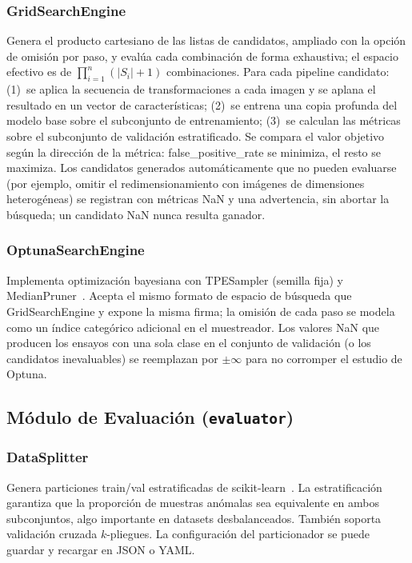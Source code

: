 \documentclass[conference,spanish]{IEEEtran}
\begin{document}
\subsubsection{GridSearchEngine}

Genera el producto cartesiano de las listas de candidatos, ampliado con la opción de omisión por paso, y
evalúa cada combinación de forma exhaustiva; el espacio efectivo es de
$\prod_{i=1}^{n} (|S_i|+1)$ combinaciones. Para cada pipeline candidato:
(1)~se aplica la secuencia de transformaciones a cada imagen y se aplana el
resultado en un vector de características; (2)~se entrena una copia profunda del modelo base sobre el subconjunto de
entrenamiento; (3)~se calculan las métricas sobre el subconjunto de
validación estratificado. Se compara el valor
objetivo según la dirección de la métrica: false\_positive\_rate se
minimiza, el resto se maximiza. Los candidatos generados automáticamente que
no pueden evaluarse (por ejemplo, omitir el redimensionamiento con imágenes
de dimensiones heterogéneas) se registran con métricas NaN y una advertencia, sin
abortar la búsqueda; un candidato NaN nunca resulta ganador.

\subsubsection{OptunaSearchEngine}

Implementa optimización bayesiana con TPESampler (semilla fija) y
MedianPruner~\cite{akiba2019optuna}. Acepta el mismo formato de
espacio de búsqueda que GridSearchEngine y expone la misma firma; la omisión de cada paso se modela como un índice
categórico adicional en el muestreador. Los valores NaN que producen los
ensayos con una sola clase en el conjunto de validación (o los candidatos
inevaluables) se reemplazan por $\pm\infty$ para no corromper el estudio de
Optuna.

\subsection{Módulo de Evaluación (\texttt{evaluator})}

\subsubsection{DataSplitter}

Genera particiones train/val estratificadas de scikit-learn~\cite{pedregosa2011sklearn}. La
estratificación garantiza que la proporción de muestras anómalas sea
equivalente en ambos subconjuntos, algo importante en datasets
desbalanceados. También soporta validación cruzada $k$-pliegues. La configuración del particionador se puede guardar y
recargar en JSON o YAML.
\end{document}
